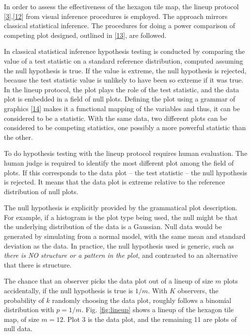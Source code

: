 \documentclass[conference,final,]{IEEEtran}
\begin{document}
In order to assess the effectiveness of the hexagon tile map, the lineup protocol {[}\protect\hyperlink{ref-GIIV}{3}{]},{[}\protect\hyperlink{ref-BCHLLSW09}{12}{]} from visual inference procedures is employed. The approach mirrors classical statistical inference. The procedures for doing a power comparison of competing plot designed, outlined in {[}\protect\hyperlink{ref-GTPCCD}{13}{]}, are followed.

In classical statistical inference hypothesis testing is conducted by comparing the value of a test statistic on a standard reference distribution, computed assuming the null hypothesis is true. If the value is extreme, the null hypothesis is rejected, because the test statistic value is unlikely to have been so extreme if it was true. In the lineup protocol, the plot plays the role of the test statistic, and the data plot is embedded in a field of null plots. Defining the plot using a grammar of graphics {[}\protect\hyperlink{ref-ggplot2}{14}{]} makes it a functional mapping of the variables and thus, it can be considered to be a statistic. With the same data, two different plots can be considered to be competing statistics, one possibly a more powerful statistic than the other.

To do hypothesis testing with the lineup protocol requires human evaluation. The human judge is required to identify the most different plot among the field of plots. If this corresponds to the data plot -- the test statistic -- the null hypothesis is rejected. It means that the data plot is extreme relative to the reference distribution of null plots.

The null hypothesis is explicitly provided by the grammatical plot description. For example, if a histogram is the plot type being used, the null might be that the underlying distribution of the data is a Gaussian. Null data would be generated by simulating from a normal model, with the same mean and standard deviation as the data. In practice, the null hypothesis used is generic, such as \emph{there is NO structure or a pattern in the plot}, and contrasted to an alternative that there is structure.

The chance that an observer picks the data plot out of a lineup of size \(m\) plots accidentally, if the null hypothesis is true is \(1/m\). With \(K\) observers, the probability of \(k\) randomly choosing the data plot, roughly follows a binomial distribution with \(p=1/m\). Fig. \ref{fig:lineup} shows a lineup of the hexagon tile map, of size \(m=12\). Plot 3 is the data plot, and the remaining 11 are plots of null data.
\end{document}
